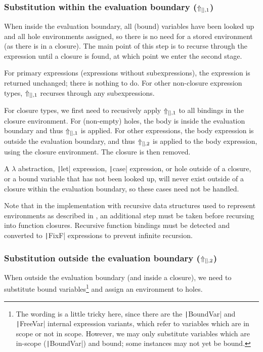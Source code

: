 \subsubsection{Substitution within the evaluation boundary ($\Uparrow_{[],1}$)}
\label{sec:postprocessing-subst-inside}

When inside the evaluation boundary, all (bound) variables have been looked up and all hole environments assigned, so there is no need for a stored environment (as there is in a closure). The main point of this step is to recurse through the expression until a closure is found, at which point we enter the second stage.

For primary expressions (expressions without subexpressions), the expression is returned unchanged; there is nothing to do. For other non-closure expression types, $\Uparrow_{[],1}$ recurses through any subexpressions.

For closure types, we first need to recusively apply $\Uparrow_{[],1}$ to all bindings in the closure environment. For (non-empty) holes, the body is inside the evaluation boundary and thus $\Uparrow_{[],1}$ is applied. For other expressions, the body expression is outside the evaluation boundary, and thus $\Uparrow_{[],2}$ is applied to the body expression, using the closure environment. The closure is then removed.

A $\lambda$ abstraction, \texttt|let| expression, \texttt|case| expression, or hole outside of a closure, or a bound variable that has not been looked up, will never exist outside of a closure within the evaluation boundary, so these cases need not be handled.

Note that in the implementation with recursive data structures used to represent environments as described in , an additional step must be taken before recursing into function closures. Recursive function bindings must be detected and converted to \texttt|FixF| expressions to prevent infinite recursion.


\subsubsection{Substitution outside the evaluation boundary ($\Uparrow_{[],2}$)}
\label{sec:postprocessing-subst-outside}

When outside the evaluation boundary (and inside a closure), we need to substitute bound variables\footnote{The wording is a little tricky here, since there are the \texttt|BoundVar| and \texttt|FreeVar| internal expression variants, which refer to variables which are in scope or not in scope. However, we may only substitute variables which are in-scope (\texttt|BoundVar|) and bound; some instances may not yet be bound.} and assign an environment to holes.

